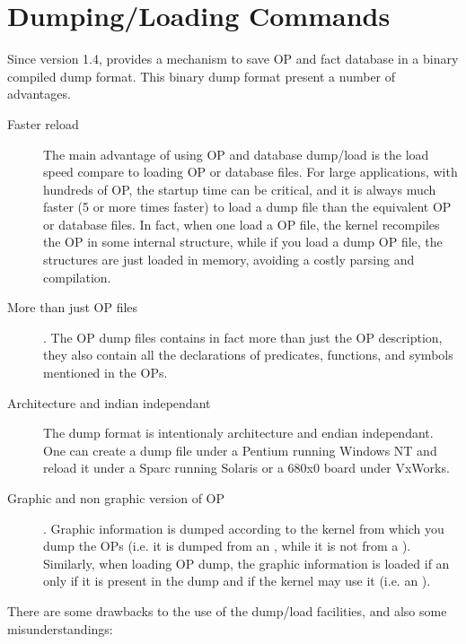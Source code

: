 \section{\CPK{} Dumping/Loading Commands}

Since version 1.4, \COPRS{} provides a mechanism to save OP and fact database in
a binary compiled dump format. This binary dump format present a number of
advantages.

\begin{description}

\item[Faster reload] The main advantage of using OP and database dump/load is
the load speed compare to loading OP or database files. For large applications,
with hundreds of OP, the startup time can be critical, and it is always much
faster (5 or more times faster) to load a dump file than the equivalent OP
or database files. In fact, when one load a OP file, the kernel recompiles the
OP in some internal structure, while if you load a dump OP file, the structures
are just loaded in memory, avoiding a costly parsing and compilation.

\item[More than just OP files]. The OP dump files contains in fact more than
just the OP description, they also contain all the declarations of predicates,
functions, and symbols mentioned in the OPs.

\item[Architecture and indian independant] The dump format is intentionaly
architecture and endian independant. One can create a dump file under a Pentium
running Windows NT and reload it under a Sparc running Solaris or a 680x0 board
under VxWorks.

\item[Graphic and non graphic version of OP]. Graphic information is dumped
according to the kernel from which you dump the OPs (i.e. it is dumped from an
\XPK{}, while it is not from a \CPK{}). Similarly, when loading OP dump, the
graphic information is loaded if an only if it is present in the dump and if
the kernel may use it (i.e. an \XPK{}).

\end{description}

There are some drawbacks to the use of the dump/load facilities, and also some
misunderstandings:

